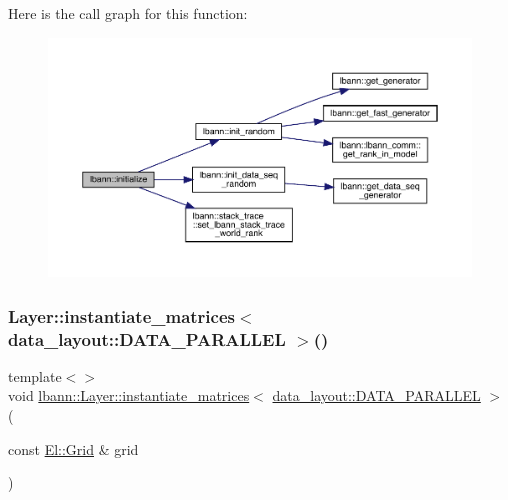 Here is the call graph for this function\+:\nopagebreak
\begin{figure}[H]
\begin{center}
\leavevmode
\includegraphics[width=350pt]{namespacelbann_a3d91b615e42bf5744deeed770879bc8c_cgraph}
\end{center}
\end{figure}
\mbox{\label{namespacelbann_af3507a38f8992e27898d63551a987341}} 
\subsubsection{\texorpdfstring{Layer\+::instantiate\+\_\+matrices$<$ data\+\_\+layout\+::\+D\+A\+T\+A\+\_\+\+P\+A\+R\+A\+L\+L\+E\+L $>$()}{Layer::instantiate\_matrices< data\_layout::DATA\_PARALLEL >()}}
{\footnotesize\ttfamily template$<$$>$ \\
void \hyperlink{classlbann_1_1Layer_a2d50e9af2a9aa7e6741deb555641c30c}{lbann\+::\+Layer\+::instantiate\+\_\+matrices}$<$ \hyperlink{base_8hpp_a786677cbfb3f5677b4d84f3056eb08dba37d2a3465f7cbf4ab60f4e79944d0638}{data\+\_\+layout\+::\+D\+A\+T\+A\+\_\+\+P\+A\+R\+A\+L\+L\+EL} $>$ (\begin{DoxyParamCaption}\item[{const \hyperlink{base_8hpp_a9951bb1719d534e0401b1f06cad19eab}{El\+::\+Grid} \&}]{grid }\end{DoxyParamCaption})}



